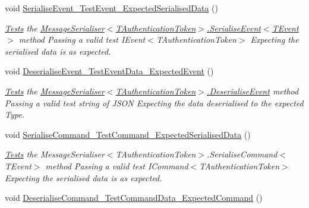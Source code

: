 \begin{DoxyCompactItemize}
\item 
void \hyperlink{classCqrs_1_1Azure_1_1ServiceBus_1_1Tests_1_1Unit_1_1MessageSerialiserTests_a9915b4ada786289ec41f1444374a3884_a9915b4ada786289ec41f1444374a3884}{Serialise\+Event\+\_\+\+Test\+Event\+\_\+\+Expected\+Serialised\+Data} ()
\begin{DoxyCompactList}\small\item\em \hyperlink{namespaceCqrs_1_1Azure_1_1ServiceBus_1_1Tests}{Tests} the \hyperlink{classCqrs_1_1Azure_1_1ServiceBus_1_1MessageSerialiser_a5650683271dec423489b016da15d8d3d_a5650683271dec423489b016da15d8d3d}{Message\+Serialiser$<$\+T\+Authentication\+Token$>$.\+Serialise\+Event$<$\+T\+Event$>$} method Passing a valid test I\+Event$<$\+T\+Authentication\+Token$>$ Expecting the serialised data is as expected. \end{DoxyCompactList}\item 
void \hyperlink{classCqrs_1_1Azure_1_1ServiceBus_1_1Tests_1_1Unit_1_1MessageSerialiserTests_ad7bc69e1f1d8741b8520f76cc5e034c2_ad7bc69e1f1d8741b8520f76cc5e034c2}{Deserialise\+Event\+\_\+\+Test\+Event\+Data\+\_\+\+Expected\+Event} ()
\begin{DoxyCompactList}\small\item\em \hyperlink{namespaceCqrs_1_1Azure_1_1ServiceBus_1_1Tests}{Tests} the \hyperlink{classCqrs_1_1Azure_1_1ServiceBus_1_1MessageSerialiser_a9207c867f358e352eee5d3727fe620e4_a9207c867f358e352eee5d3727fe620e4}{Message\+Serialiser$<$\+T\+Authentication\+Token$>$.\+Deserialise\+Event} method Passing a valid test string of J\+S\+ON Expecting the data deserialised to the expected Type. \end{DoxyCompactList}\item 
void \hyperlink{classCqrs_1_1Azure_1_1ServiceBus_1_1Tests_1_1Unit_1_1MessageSerialiserTests_a9a2a5ddf1c109f58bb27c651fb9ec42a_a9a2a5ddf1c109f58bb27c651fb9ec42a}{Serialise\+Command\+\_\+\+Test\+Command\+\_\+\+Expected\+Serialised\+Data} ()
\begin{DoxyCompactList}\small\item\em \hyperlink{namespaceCqrs_1_1Azure_1_1ServiceBus_1_1Tests}{Tests} the Message\+Serialiser$<$\+T\+Authentication\+Token$>$.\+Serialise\+Command$<$\+T\+Event$>$ method Passing a valid test I\+Command$<$\+T\+Authentication\+Token$>$ Expecting the serialised data is as expected. \end{DoxyCompactList}\item 
void \hyperlink{classCqrs_1_1Azure_1_1ServiceBus_1_1Tests_1_1Unit_1_1MessageSerialiserTests_a33c0538a90a7ed653350ccc7d3c38f49_a33c0538a90a7ed653350ccc7d3c38f49}{Deserialise\+Command\+\_\+\+Test\+Command\+Data\+\_\+\+Expected\+Command} ()

\end{DoxyCompactItemize}
